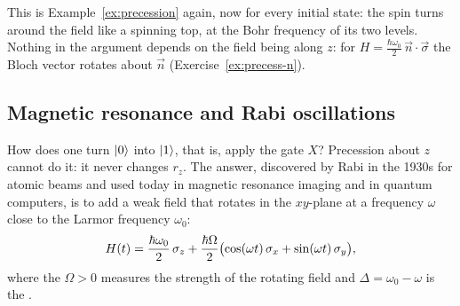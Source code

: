 This is Example~\ref{ex:precession} again, now for every initial state: the spin turns around the field like a spinning top, at the Bohr frequency of its two levels. Nothing in the argument depends on the field being along $z$: for $H=\tfrac{\hbar\omega_0}2\,\vec n\cdot\vec\sigma$ the Bloch vector rotates about $\vec n$ (Exercise~\ref{ex:precess-n}).

\subsection{Magnetic resonance and Rabi oscillations}

How does one turn $\left|0\right\rangle$ into $\left|1\right\rangle$, that is, apply the gate $X$? Precession about $z$ cannot do it: it never changes $r_z$. The answer, discovered by Rabi in the 1930s for atomic beams and used today in magnetic resonance imaging and in quantum computers, is to add a weak field that rotates in the $xy$-plane at a frequency $\omega$ close to the Larmor frequency $\omega_0$:
\[
  H(t)=\frac{\hbar\omega_0}2\,\sigma_z+\frac{\hbar\Omega}2\bigl(\cos(\omega t)\,\sigma_x+\sin(\omega t)\,\sigma_y\bigr),
\]
where the  $\Omega>0$ measures the strength of the rotating field and $\Delta=\omega_0-\omega$ is the .

